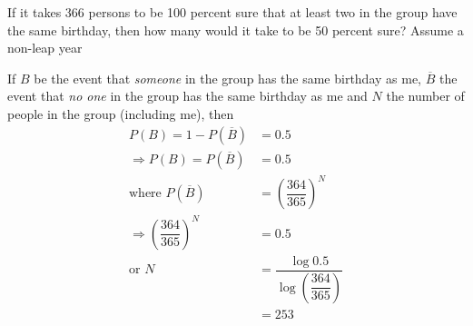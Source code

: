 
%
%
%
%
% 
% 

\question If it takes 366 persons to be 100 percent sure that at least two in the group
have the same birthday, then how many would it take to be 50 percent sure? Assume a non-leap year

\insertQR{}

\ifprintanswers
\fi 

\begin{solution}
   If $B$ be the event that \textit{someone} in the group has the same birthday as me,
   $\overline{B}$ the event that \textit{no one} in the group has the same
   birthday as me and $N$ the number of people in the group (including me), then 
   \begin{align}
     P(B) = 1 - P(\overline{B}) &= 0.5 \\
     \Rightarrow P(B) = P(\overline{B}) &= 0.5 \\
     \text{where } P(\overline{B}) &= \left(\dfrac{364}{365}\right)^N \\
     \Rightarrow \left(\dfrac{364}{365}\right)^N &= 0.5 \\
     \text{or } N &= \dfrac{\log 0.5}{\log\left(\dfrac{364}{365}\right)} \\
       &= 253
   \end{align} 
\end{solution}
